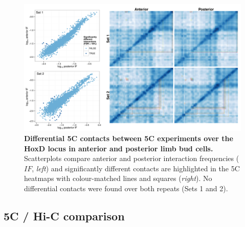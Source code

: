 \documentclass[a4paper,11pt,oneside]{book}
\begin{document}
\begin{figure}
\begin{center} 
\includegraphics[width=\textwidth]{figs/5cdiff.pdf}
\captionsetup{width=\textwidth} 
\caption[Differential 5C contacts between 5C experiments over the HoxD locus in anterior and posterior limb bud cells.]{ {\bf Differential 5C contacts between 5C experiments over the HoxD locus in anterior and posterior limb bud cells. }
Scatterplots compare anterior and posterior interaction frequencies ($IF$, \emph{left}) and significantly different contacts are highlighted in the 5C heatmaps with colour-matched lines and squares (\emph{right}). No differential contacts were found over both repeats (Sets 1 and 2).
}\label{fig:5cdiff}
\end{center} 
\end{figure} 


\subsection{5C / Hi-C comparison}

\end{document}
